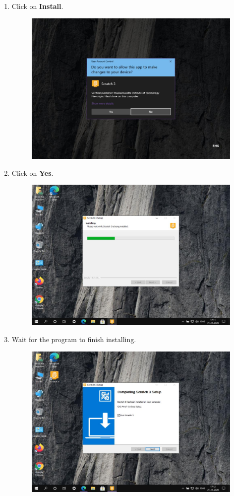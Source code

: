 \documentclass[a4paper]{article}
\begin{document}
\begin{enumerate}
    \item Click on \textbf{Install}.

          \begin{figure}[H]
              \centering
              \includegraphics[width = .8\linewidth]{03}
          \end{figure}

    \item Click on \textbf{Yes}.

          \begin{figure}[H]
              \centering
              \includegraphics[width = .8\linewidth]{04}
          \end{figure}

    \item Wait for the program to finish installing.

          \begin{figure}[H]
              \centering
              \includegraphics[width = .8\linewidth]{05}
          \end{figure}


\end{enumerate}
\end{document}
